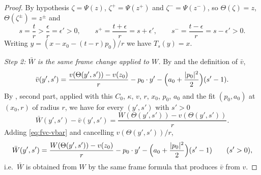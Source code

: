 \begin{proof}
By hypothesis $\zeta=\Psi(z)$, $\zeta^+=\Psi(z^+)$ and $\zeta^-=\Psi(z^-)$, so
$\Theta(\zeta)=z$, $\Theta(\zeta^\pm)=z^\pm$ and
\begin{equation}\label{eq:fvc-times}
  s=\frac tr>\frac\epsilon r=\epsilon'>0,\qquad
  s^+=\frac{t+\epsilon}{r}=s+\epsilon',\qquad
  s^-=\frac{t-\epsilon}{r}=s-\epsilon'>0 .
\end{equation}
Writing $y=(x-x_0-(t-r)p_0)/r$ we have $T_s(y)=x$.

\emph{Step 2: $\bar W$ is the same frame change applied to $W$.}
By  and the definition of $\bar v$,
\begin{equation}\label{eq:fvc-vbar}
  \bar v(y',s')=\frac{v(\Theta(y',s'))-v(z_0)}{r}
     -p_0\cdot y'-\Bigl(a_0+\frac{|p_0|^2}{2}\Bigr)(s'-1).
\end{equation}
By , second part, applied with this $C_0$, $\kappa$,
$v$, $r$, $x_0$, $p_0$, $a_0$ and the fit $(p_0,a_0)$ at $(x_0,r)$ of radius
$r$, we have for every $(y',s')$ with $s'>0$
\[
  \bar W(y',s')-\bar v(y',s')
   =\frac{W(\Theta(y',s'))-v(\Theta(y',s'))}{r}.
\]
Adding \eqref{eq:fvc-vbar} and cancelling $v(\Theta(y',s'))/r$,
\begin{equation}\label{eq:fvc-Wbar}
  \bar W(y',s')=\frac{W(\Theta(y',s'))-v(z_0)}{r}
     -p_0\cdot y'-\Bigl(a_0+\frac{|p_0|^2}{2}\Bigr)(s'-1)
  \qquad(s'>0),
\end{equation}
i.e.\ $\bar W$ is obtained from $W$ by the same frame formula that produces
$\bar v$ from $v$.


\end{proof}

